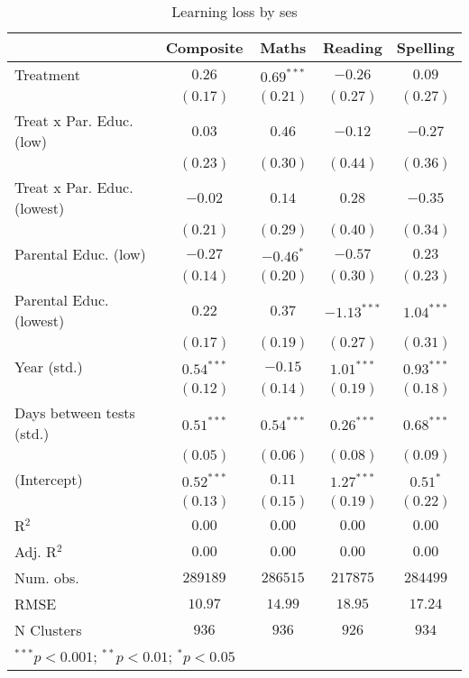 
\begin{table}
\begin{center}
\begin{tabular}{l c c c c}
\hline
 & Composite & Maths & Reading & Spelling \\
\hline
Treatment                   & $0.26$       & $0.69^{***}$ & $-0.26$       & $0.09$       \\
                            & $(0.17)$     & $(0.21)$     & $(0.27)$      & $(0.27)$     \\
Treat x Par. Educ. (low)    & $0.03$       & $0.46$       & $-0.12$       & $-0.27$      \\
                            & $(0.23)$     & $(0.30)$     & $(0.44)$      & $(0.36)$     \\
Treat x Par. Educ. (lowest) & $-0.02$      & $0.14$       & $0.28$        & $-0.35$      \\
                            & $(0.21)$     & $(0.29)$     & $(0.40)$      & $(0.34)$     \\
Parental Educ. (low)        & $-0.27$      & $-0.46^{*}$  & $-0.57$       & $0.23$       \\
                            & $(0.14)$     & $(0.20)$     & $(0.30)$      & $(0.23)$     \\
Parental Educ. (lowest)     & $0.22$       & $0.37$       & $-1.13^{***}$ & $1.04^{***}$ \\
                            & $(0.17)$     & $(0.19)$     & $(0.27)$      & $(0.31)$     \\
Year (std.)                 & $0.54^{***}$ & $-0.15$      & $1.01^{***}$  & $0.93^{***}$ \\
                            & $(0.12)$     & $(0.14)$     & $(0.19)$      & $(0.18)$     \\
Days between tests (std.)   & $0.51^{***}$ & $0.54^{***}$ & $0.26^{***}$  & $0.68^{***}$ \\
                            & $(0.05)$     & $(0.06)$     & $(0.08)$      & $(0.09)$     \\
(Intercept)                 & $0.52^{***}$ & $0.11$       & $1.27^{***}$  & $0.51^{*}$   \\
                            & $(0.13)$     & $(0.15)$     & $(0.19)$      & $(0.22)$     \\
\hline
R$^2$                       & $0.00$       & $0.00$       & $0.00$        & $0.00$       \\
Adj. R$^2$                  & $0.00$       & $0.00$       & $0.00$        & $0.00$       \\
Num. obs.                   & $289189$     & $286515$     & $217875$      & $284499$     \\
RMSE                        & $10.97$      & $14.99$      & $18.95$       & $17.24$      \\
N Clusters                  & $936$        & $936$        & $926$         & $934$        \\
\hline
\multicolumn{5}{l}{\scriptsize{$^{***}p<0.001$; $^{**}p<0.01$; $^{*}p<0.05$}}
\end{tabular}
\caption{Learning loss by ses}
\label{tableses}
\end{center}
\end{table}
